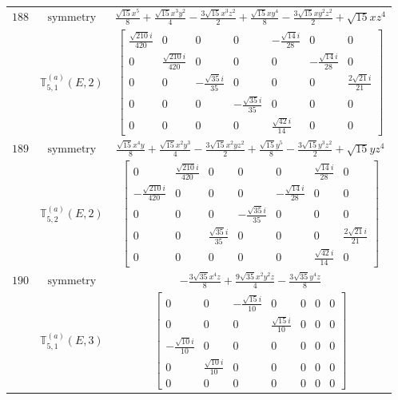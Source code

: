 \documentclass[fleqn,8pt,landscape]{jsarticle}
\begin{document}
\begin{longtable}{ccc}
$ 188 $ & $ \text{symmetry} $ & $ \frac{\sqrt{15} x^{5}}{8} + \frac{\sqrt{15} x^{3} y^{2}}{4} - \frac{3 \sqrt{15} x^{3} z^{2}}{2} + \frac{\sqrt{15} x y^{4}}{8} - \frac{3 \sqrt{15} x y^{2} z^{2}}{2} + \sqrt{15} x z^{4} $ \\
$  $ & $ \mathbb{T}_{5,1}^{(a)}(E,2) $ & $ \begin{bmatrix} \frac{\sqrt{210} i}{420} & 0 & 0 & 0 & - \frac{\sqrt{14} i}{28} & 0 & 0 \\ 0 & \frac{\sqrt{210} i}{420} & 0 & 0 & 0 & - \frac{\sqrt{14} i}{28} & 0 \\ 0 & 0 & - \frac{\sqrt{35} i}{35} & 0 & 0 & 0 & \frac{2 \sqrt{21} i}{21} \\ 0 & 0 & 0 & - \frac{\sqrt{35} i}{35} & 0 & 0 & 0 \\ 0 & 0 & 0 & 0 & \frac{\sqrt{42} i}{14} & 0 & 0 \end{bmatrix} $ \\ \hline
$ 189 $ & $ \text{symmetry} $ & $ \frac{\sqrt{15} x^{4} y}{8} + \frac{\sqrt{15} x^{2} y^{3}}{4} - \frac{3 \sqrt{15} x^{2} y z^{2}}{2} + \frac{\sqrt{15} y^{5}}{8} - \frac{3 \sqrt{15} y^{3} z^{2}}{2} + \sqrt{15} y z^{4} $ \\
$  $ & $ \mathbb{T}_{5,2}^{(a)}(E,2) $ & $ \begin{bmatrix} 0 & \frac{\sqrt{210} i}{420} & 0 & 0 & 0 & \frac{\sqrt{14} i}{28} & 0 \\ - \frac{\sqrt{210} i}{420} & 0 & 0 & 0 & - \frac{\sqrt{14} i}{28} & 0 & 0 \\ 0 & 0 & 0 & - \frac{\sqrt{35} i}{35} & 0 & 0 & 0 \\ 0 & 0 & \frac{\sqrt{35} i}{35} & 0 & 0 & 0 & \frac{2 \sqrt{21} i}{21} \\ 0 & 0 & 0 & 0 & 0 & \frac{\sqrt{42} i}{14} & 0 \end{bmatrix} $ \\ \hline
$ 190 $ & $ \text{symmetry} $ & $ - \frac{3 \sqrt{35} x^{4} z}{8} + \frac{9 \sqrt{35} x^{2} y^{2} z}{4} - \frac{3 \sqrt{35} y^{4} z}{8} $ \\
$  $ & $ \mathbb{T}_{5,1}^{(a)}(E,3) $ & $ \begin{bmatrix} 0 & 0 & - \frac{\sqrt{15} i}{10} & 0 & 0 & 0 & 0 \\ 0 & 0 & 0 & \frac{\sqrt{15} i}{10} & 0 & 0 & 0 \\ - \frac{\sqrt{10} i}{10} & 0 & 0 & 0 & 0 & 0 & 0 \\ 0 & \frac{\sqrt{10} i}{10} & 0 & 0 & 0 & 0 & 0 \\ 0 & 0 & 0 & 0 & 0 & 0 & 0 \end{bmatrix} $ \\ \hline

\end{longtable}
\end{document}

